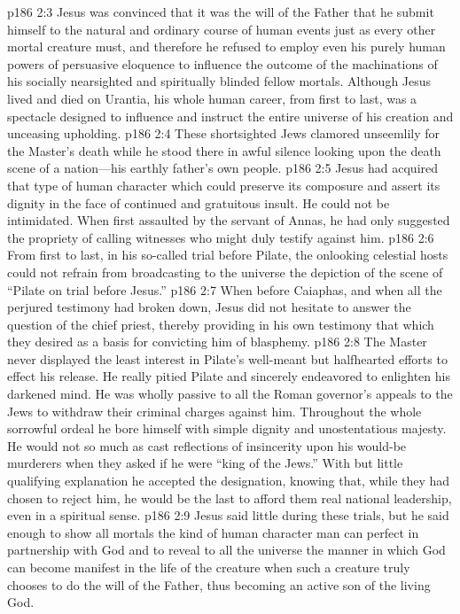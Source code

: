 \vs p186 2:3 Jesus was convinced that it was the will of the Father that he submit himself to the natural and ordinary course of human events just as every other mortal creature must, and therefore he refused to employ even his purely human powers of persuasive eloquence to influence the outcome of the machinations of his socially nearsighted and spiritually blinded fellow mortals. Although Jesus lived and died on Urantia, his whole human career, from first to last, was a spectacle designed to influence and instruct the entire universe of his creation and unceasing upholding.
\pc \vs p186 2:4 These shortsighted Jews clamored unseemlily for the Master’s death while he stood there in awful silence looking upon the death scene of a nation---his earthly father’s own people.
\pc \vs p186 2:5 Jesus had acquired that type of human character which could preserve its composure and assert its dignity in the face of continued and gratuitous insult. He could not be intimidated. When first assaulted by the servant of Annas, he had only suggested the propriety of calling witnesses who might duly testify against him.
\vs p186 2:6 From first to last, in his so\hyp{}called trial before Pilate, the onlooking celestial hosts could not refrain from broadcasting to the universe the depiction of the scene of “Pilate on trial before Jesus.”
\vs p186 2:7 When before Caiaphas, and when all the perjured testimony had broken down, Jesus did not hesitate to answer the question of the chief priest, thereby providing in his own testimony that which they desired as a basis for convicting him of blasphemy.
\vs p186 2:8 The Master never displayed the least interest in Pilate’s well\hyp{}meant but halfhearted efforts to effect his release. He really pitied Pilate and sincerely endeavored to enlighten his darkened mind. He was wholly passive to all the Roman governor’s appeals to the Jews to withdraw their criminal charges against him. Throughout the whole sorrowful ordeal he bore himself with simple dignity and unostentatious majesty. He would not so much as cast reflections of insincerity upon his would\hyp{}be murderers when they asked if he were “king of the Jews.” With but little qualifying explanation he accepted the designation, knowing that, while they had chosen to reject him, he would be the last to afford them real national leadership, even in a spiritual sense.
\vs p186 2:9 Jesus said little during these trials, but he said enough to show all mortals the kind of human character man can perfect in partnership with God and to reveal to all the universe the manner in which God can become manifest in the life of the creature when such a creature truly chooses to do the will of the Father, thus becoming an active son of the living God.
